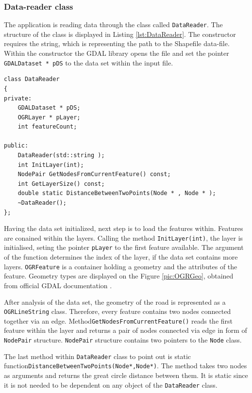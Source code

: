 \documentclass[thesis=M,english]{FITthesis}[2012/10/20]
\begin{document}
\subsubsection{Data-reader class}
The application is reading data through the class called \texttt{DataReader}. The structure of the class is displayed in Listing \ref{lst:DataReader}. The constructor requires the string, which is representing the path to the Shapefile data-file. Within the constructor the GDAL library opens the file and set the pointer \texttt{GDALDataset * pDS} to the data set within the input file.

\begin{lstlisting}[frame=single, caption={\texttt{DataReader} class}, label={lst:DataReader}]
class DataReader
{
private:
    GDALDataset * pDS;
    OGRLayer * pLayer;
    int featureCount;

public:
    DataReader(std::string );
    int InitLayer(int);
    NodePair GetNodesFromCurrentFeature() const;
    int GetLayerSize() const;
    double static DistanceBetweenTwoPoints(Node * , Node * );
    ~DataReader();
};
\end{lstlisting}

Having the data set initialized, next step is to load the features within. Features are conained within the layers. Calling the method \texttt{InitLayer(int)}, the layer is initialised, seting the pointer \texttt{pLayer} to the first feature available. The argument of the function determines the index of the layer, if the data set contains more layers. \texttt{OGRFeature} is a container holding a geometry and the attributes of the feature. Geometry types are displayed on the Figure \ref{pic:OGRGeo}, obtained from official GDAL documentation \cite{GDAL17}. 



After analysis of the data set, the geometry of the road is represented as a \texttt{OGRLineString} class. Therefore, every feature contains two nodes connected together via an edge. Method\texttt{GetNodesFromCurrentFeature()} reads the first feature within the layer and returns a pair of nodes connected via edge in form of \texttt{NodePair} structure. \texttt{NodePair} structure contains two pointers to the \texttt{Node} class. 

The last method within \texttt{DataReader} class to point out is static function\texttt{DistanceBetweenTwoPoints(Node*,Node*)}. The method takes two nodes as arguments and returns the great circle distance between them. It is static since it is not needed to be dependent on any object of the \texttt{DataReader} class.
\end{document}
